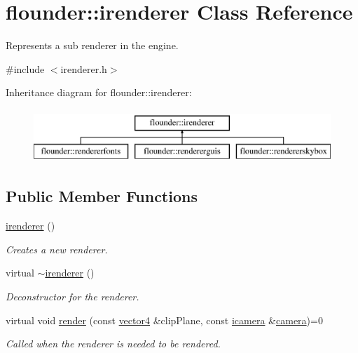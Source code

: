 \hypertarget{classflounder_1_1irenderer}{}\section{flounder\+:\+:irenderer Class Reference}
\label{classflounder_1_1irenderer}


Represents a sub renderer in the engine.  




{\ttfamily \#include $<$irenderer.\+h$>$}

Inheritance diagram for flounder\+:\+:irenderer\+:\begin{figure}[H]
\begin{center}
\leavevmode
\includegraphics[height=2.000000cm]{classflounder_1_1irenderer}
\end{center}
\end{figure}
\subsection*{Public Member Functions}
\begin{DoxyCompactItemize}
\item 
\hyperlink{classflounder_1_1irenderer_a2a7c7ca8dbde0b7322a49ed909c9b6f6}{irenderer} ()
\begin{DoxyCompactList}\small\item\em Creates a new renderer. \end{DoxyCompactList}\item 
virtual \hyperlink{classflounder_1_1irenderer_a241b5071119fdfe45630e366dfa16e2b}{$\sim$irenderer} ()
\begin{DoxyCompactList}\small\item\em Deconstructor for the renderer. \end{DoxyCompactList}\item 
virtual void \hyperlink{classflounder_1_1irenderer_a3f355dc39e2680bf3f3441d3dfaaa010}{render} (const \hyperlink{classflounder_1_1vector4}{vector4} \&clip\+Plane, const \hyperlink{classflounder_1_1icamera}{icamera} \&\hyperlink{classflounder_1_1camera}{camera})=0
\begin{DoxyCompactList}\small\item\em Called when the renderer is needed to be rendered. \end{DoxyCompactList}\end{DoxyCompactItemize}


